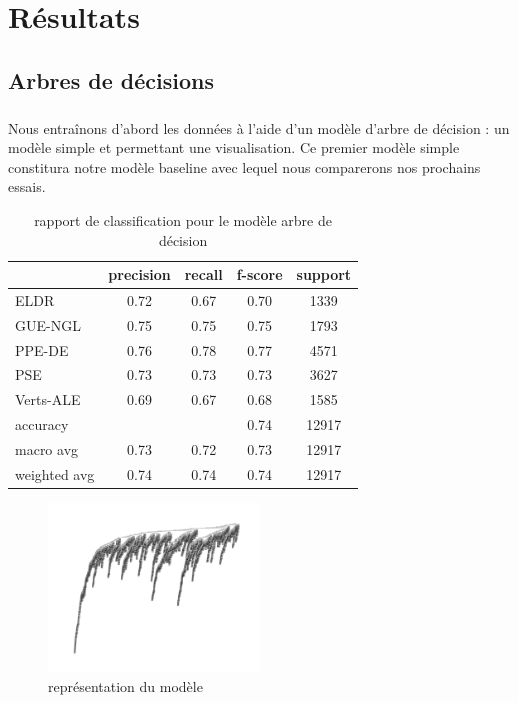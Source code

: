 \documentclass[11pt]{article}
\begin{document}
\section{Résultats}

\subsection{Arbres de décisions}

\subparagraph{}
Nous entraînons d'abord les données à l'aide d'un modèle d'arbre de décision : un modèle simple et permettant une visualisation. Ce premier modèle simple constitura notre modèle baseline avec lequel nous comparerons nos prochains essais.

\begin{table}[h]
\centering
\begin{tabular}{lcccc}
\hline
 & precision & recall & f-score & support\\
\hline
ELDR & 0.72 & 0.67 & 0.70 & 1339\\
GUE-NGL & 0.75 & 0.75 & 0.75 & 1793\\
PPE-DE & 0.76 & 0.78 & 0.77 & 4571\\ 
PSE &  0.73 & 0.73 & 0.73 & 3627\\ 
Verts-ALE & 0.69 & 0.67 & 0.68 & 1585\\
\hline
accuracy& & & 0.74 & 12917\\
macro avg & 0.73 & 0.72 & 0.73& 12917\\
weighted avg & 0.74 & 0.74 & 0.74& 12917\\
\hline
\end{tabular}
\caption{rapport de classification pour le modèle arbre de décision}
\label{tab:accents}
\end{table}

\begin{figure}[h]
\includegraphics[width=0.5\textwidth]{decision_tree}
\caption{représentation du modèle}
\centering
\end{figure}
\end{document}

